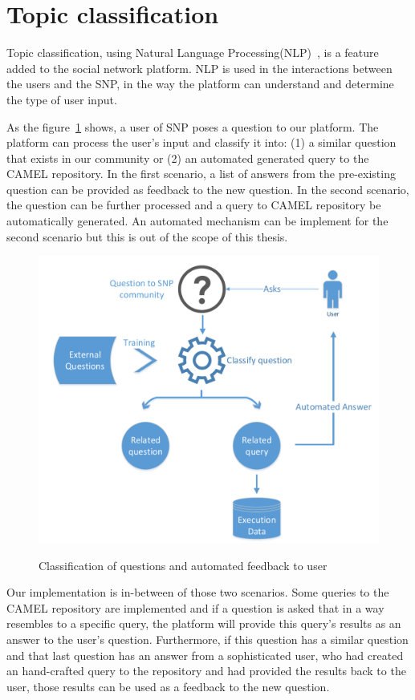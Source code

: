 \section{Topic classification}
\label{sec:natural_implementation}
Topic classification, using Natural Language Processing(NLP)~\cite{manning1999foundations}, is a feature added to the social network platform. NLP is used in the interactions between the users and the SNP, in the way the platform can understand and determine the type of user input. 

As the figure~\ref{fig:auto_classification} shows, a user of SNP poses a question to our platform. The platform can process the user's input and classify it into: (1) a similar question that exists in our community or (2) an automated generated query to the CAMEL repository. In the first scenario, a list of answers from the pre-existing question can be provided as feedback to the new question. In the second scenario, the question can be further processed and a query to CAMEL repository be automatically generated. An automated mechanism can be implement for the second scenario but this is out of the scope of this thesis.  

\begin{figure}[h]
	\caption{Classification of questions and automated feedback to user}
	\includegraphics[width=1\textwidth]{./fig/Decision_making.pdf}
	\centering
	\label{fig:auto_classification}
\end{figure}

Our implementation is in-between of those two scenarios. Some queries to the CAMEL repository are implemented and if a question is asked that in a way resembles to a specific query, the platform will provide this query's results as an answer to the user's question. Furthermore, if this question has a similar question and that last question has an answer from a sophisticated user, who had created an hand-crafted query to the repository and had provided the results back to the user, those results can be used as a feedback to the new question. 

